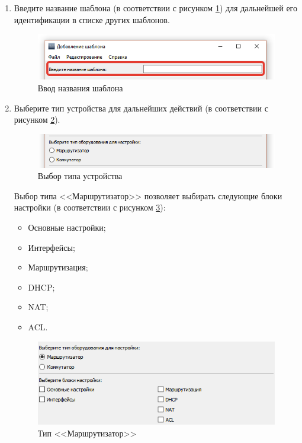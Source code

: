 \begin{enumerate}
	\item Введите название шаблона (в соответствии с рисунком \ref{fig:template_window_edit_name}) для дальнейшей его идентификации в списке других шаблонов.

\begin{figure}[ht!]
\centering
\includegraphics[width=1\linewidth]{pic/template_window_edit_name}
\caption{Ввод названия шаблона}
\label{fig:template_window_edit_name}
\end{figure}

	\item Выберите тип устройства для дальнейших действий (в соответствии с рисунком \ref{fig:template_window_edit_type}).

\begin{figure}[ht!]
\centering
\includegraphics[width=1\linewidth]{pic/template_window_edit_type}
\caption{Выбор типа устройства}
\label{fig:template_window_edit_type}
\end{figure}

Выбор типа <<Маршрутизатор>> позволяет выбирать следующие блоки настройки (в соответствии с рисунком \ref{fig:type_router}):
\begin{itemize}
	\item Основные настройки;
	\item Интерфейсы;
	\item Маршрутизация;
	\item DHCP;
	\item NAT;
	\item ACL.
\end{itemize}

\begin{figure}[th!]
\centering
\includegraphics[width=1\linewidth]{pic/type_router}
\caption{Тип <<Маршрутизатор>>}
\label{fig:type_router}
\end{figure}


\end{enumerate}
